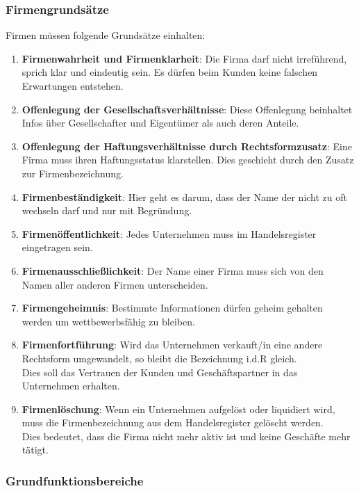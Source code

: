 \documentclass[10pt]{article}
\begin{document}
\subsubsection{Firmengrundsätze}
Firmen müssen folgende Grundsätze einhalten: 
\begin{enumerate}
\item \textbf{Firmenwahrheit und Firmenklarheit}: Die Firma darf nicht irreführend,  sprich klar und eindeutig sein. Es dürfen beim Kunden keine falschen Erwartungen entstehen.
\item \textbf{Offenlegung der Gesellschaftsverhältnisse}: Diese Offenlegung beinhaltet Infos über Gesellschafter und Eigentümer als auch deren Anteile.
\item \textbf{Offenlegung der Haftungsverhältnisse durch Rechtsformzusatz}: Eine Firma muss ihren Haftungsstatus klarstellen. Dies geschieht durch den Zusatz zur Firmenbezeichnung.
\item \textbf{Firmenbeständigkeit}: Hier geht es darum, dass  der Name der nicht zu  oft wechseln darf und nur mit Begründung.
\item \textbf{Firmenöffentlichkeit}:  Jedes Unternehmen muss im Handelsregister eingetragen sein. 
\item \textbf{Firmenausschließlichkeit}: Der Name einer Firma muss sich von den Namen aller anderen Firmen unterscheiden.
\item \textbf{Firmengeheimnis}: Bestimmte Informationen dürfen geheim gehalten werden um wettbewerbsfähig zu bleiben.
\item \textbf{Firmenfortführung}: Wird das Unternehmen  verkauft/in eine  andere Rechtsform umgewandelt, so bleibt die Bezeichnung i.d.R gleich. \\
Dies soll das Vertrauen der Kunden und Geschäftspartner in das Unternehmen erhalten.
\item \textbf{Firmenlöschung}: Wenn ein Unternehmen aufgelöst oder liquidiert wird, muss die Firmenbezeichnung aus dem Handelsregister gelöscht werden. \\
Dies bedeutet, dass die Firma nicht mehr aktiv ist und keine Geschäfte mehr tätigt. 
\end{enumerate}

\subsubsection{Grundfunktionsbereiche}
\end{document}
